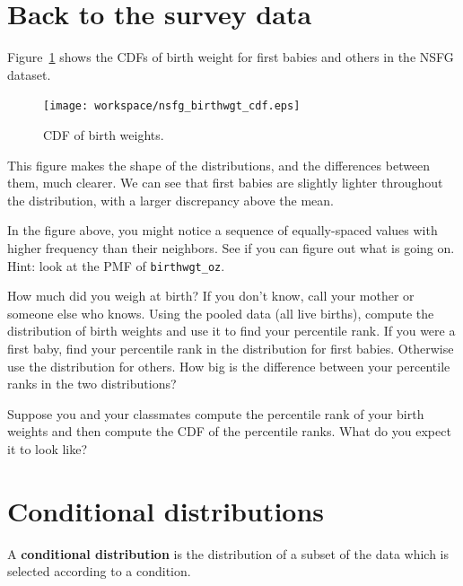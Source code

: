 \documentclass[12pt]{book}
\begin{document}
\section{Back to the survey data}
\label{birth_weights}

Figure~\ref{nsfg_birthwgt_cdf} shows the CDFs of birth weight for
first babies and others in the NSFG dataset.

\begin{figure}
\centerline{\texttt{[image: workspace/nsfg\_birthwgt\_cdf.eps]}}
\caption{CDF of birth weights.}
\label{nsfg_birthwgt_cdf}
\end{figure}

This figure makes the shape of the distributions, and the differences
between them, much clearer.  We can see that first babies are slightly
lighter throughout the distribution, with a larger discrepancy above 
the mean.

\begin{ex}

In the figure above, you might notice
a sequence of equally-spaced values with higher frequency than
their neighbors.  See if you can figure out what is going on.
Hint: look at the PMF of \verb"birthwgt_oz".

\end{ex}

\begin{ex}
How much did you weigh at birth?  If you don't know, call your mother
or someone else who knows.  Using the pooled data (all live births),
compute the distribution of birth weights and use it to find your
percentile rank.  If you were a first baby, find your percentile rank
in the distribution for first babies.  Otherwise use the distribution
for others.  How big is the difference between your percentile ranks
in the two distributions?
\end{ex}

\begin{ex}
Suppose you and your classmates compute the percentile rank of your
birth weights and then compute the CDF of the percentile ranks.  What do
you expect it to look like?
\end{ex}


\section{Conditional distributions}

A {\bf conditional distribution} is the distribution of a subset of
the data which is selected according to a condition.
\end{document}
